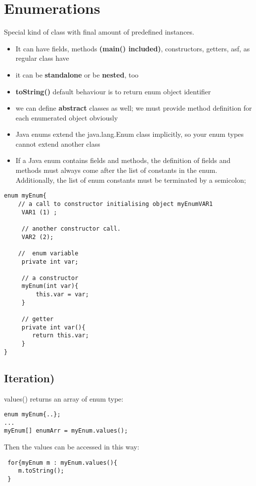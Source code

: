 \documentclass{report}
\begin{document}
\chapter{Enumerations}
Special kind of class with final amount of predefined instances.
\begin{itemize}
  \item It can have fields, methods \textbf{(main() included)}, 
constructors, getters, asf, as regular class have
  \item it can be \textbf{standalone} or be \textbf{nested}, too
  \item \textbf{toString()} default behaviour is to return enum object identifier
  \item we can define \textbf{abstract} classes as well; we must provide 
  method definition for each enumerated object obviously
  \item  Java enums extend the java.lang.Enum class implicitly, so your enum types cannot extend another class
  \item If a Java enum contains fields and methods, the definition of fields and methods must always come after 
  the list of constants in the enum. Additionally, the list of enum constants must be terminated by a semicolon; 
\end{itemize}
\begin{verbatim}
enum myEnum{
	// a call to constructor initialising object myEnumVAR1
	 VAR1 (1) ;
	 
	 // another constructor call.
	 VAR2 (2);
	 
	//  enum variable
	 private int var;
	 
	 // a constructor
	 myEnum(int var){
	     this.var = var;
	 }
	 
	 // getter
	 private int var(){
	 	return this.var;
	 }
}
\end{verbatim}

\section{Iteration)}
values() returns an array of enum type:
\begin{verbatim}
enum myEnum{..};
...
myEnum[] enumArr = myEnum.values();
\end{verbatim}
 
 Then the values can be accessed in this way:
 \begin{verbatim}
 for{myEnum m : myEnum.values(){
    m.toString();
 }
 \end{verbatim}
 
\end{document}
